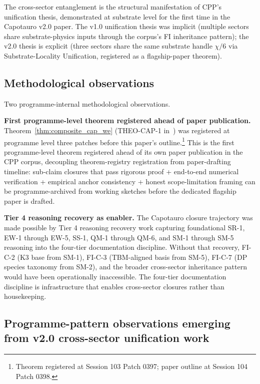 \documentclass[11pt,letterpaper]{article}
\begin{document}
The cross-sector entanglement is the structural manifestation of CPP's unification thesis, demonstrated at substrate level for the first time in the Capotauro v2.0 paper. The v1.0 unification thesis was implicit (multiple sectors share substrate-physics inputs through the corpus's FI inheritance pattern); the v2.0 thesis is explicit (three sectors share the same substrate handle $\chi/6$ via Substrate-Locality Unification, registered as a flagship-paper theorem).

\subsection{Methodological observations}\label{sec:methodological_observations}

Two programme-internal methodological observations.

\textbf{First programme-level theorem registered ahead of paper publication.} Theorem~\ref{thm:composite_cap_we} (THEO-CAP-1 in~\cite{abshier_theorem_registry}) was registered at programme level three patches before this paper's outline.\footnote{Theorem registered at Session 103 Patch 0397; paper outline at Session 104 Patch 0398.} This is the first programme-level theorem registered ahead of its own paper publication in the CPP corpus, decoupling theorem-registry registration from paper-drafting timeline: sub-claim closures that pass rigorous proof + end-to-end numerical verification + empirical anchor consistency + honest scope-limitation framing can be programme-archived from working sketches before the dedicated flagship paper is drafted.

\textbf{Tier 4 reasoning recovery as enabler.} The Capotauro closure trajectory was made possible by Tier 4 reasoning recovery work capturing foundational SR-1, EW-1 through EW-5, SS-1, QM-1 through QM-6, and SM-1 through SM-5 reasoning into the four-tier documentation discipline. Without that recovery, FI-C-2 (K3 base from SM-1), FI-C-3 (TBM-aligned basis from SM-5), FI-C-7 (DP species taxonomy from SM-2), and the broader cross-sector inheritance pattern would have been operationally inaccessible. The four-tier documentation discipline is infrastructure that enables cross-sector closures rather than housekeeping.

\subsection{Programme-pattern observations emerging from v2.0 cross-sector unification work}\label{sec:v2_programme_patterns}
\end{document}
